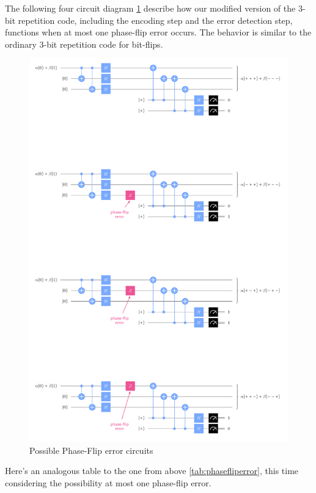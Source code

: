 \documentclass[12pt, oneside]{book}
\theoremstyle{definition}
\theoremstyle{definition}
\theoremstyle{remark}
\begin{document}
The following four circuit diagram \ref{fig:possphaseflip} describe how our modified version of the $3$-bit repetition code, including the encoding step and the error detection step, functions when at most one phase-flip error occurs. The behavior is similar to the ordinary $3$-bit repetition code for bit-flips.
\begin{figure}[ht]
    \centering
    \includegraphics[width=0.75\linewidth]{../images/phasefliperr4circs.png}
    \caption{Possible Phase-Flip error circuits}
    \label{fig:possphaseflip}
\end{figure}
Here's an analogous table to the one from above \ref{tab:phasefliperror}, this time considering the possibility at most one phase-flip error.
\end{document}
